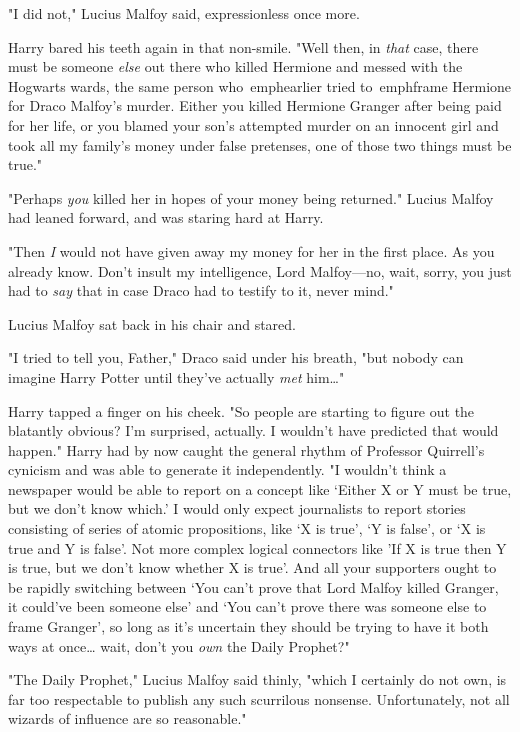 "I did not," Lucius Malfoy said, expressionless once more.

Harry bared his teeth again in that non-smile. "Well then, in \emph{that} case, 
there must be someone \emph{else} out there who killed Hermione and messed with 
the Hogwarts wards, the same person who\ emph{earlier} tried to\ emph{frame 
Hermione for Draco Malfoy's murder.} Either you killed Hermione Granger after 
being paid for her life, or you blamed your son's attempted murder on an 
innocent girl and took all my family's money under false pretenses, one of 
those two things must be true."

"Perhaps \emph{you} killed her in hopes of your money being returned." Lucius 
Malfoy had leaned forward, and was staring hard at Harry.

"Then \emph{I} would not have given away my money for her in the first place. 
As you already know. Don't insult my intelligence, Lord Malfoy---no, wait, 
sorry, you just had to \emph{say} that in case Draco had to testify to it, 
never mind."

Lucius Malfoy sat back in his chair and stared.

"I tried to tell you, Father," Draco said under his breath, "but nobody can 
imagine Harry Potter until they've actually \emph{met} him{\ldots}"

Harry tapped a finger on his cheek. "So people are starting to figure out the 
blatantly obvious? I'm surprised, actually. I wouldn't have predicted that 
would happen." Harry had by now caught the general rhythm of Professor 
Quirrell's cynicism and was able to generate it independently. "I wouldn't 
think a newspaper would be able to report on a concept like `Either X or Y must 
be true, but we don't know which.' I would only expect journalists to report 
stories consisting of series of atomic propositions, like `X is true', `Y is 
false', or `X is true and Y is false'. Not more complex logical connectors like 
'If X is true then Y is true, but we don't know whether X is true'. And all 
your supporters ought to be rapidly switching between `You can't prove that 
Lord Malfoy killed Granger, it could've been someone else' and `You can't prove 
there was someone else to frame Granger', so long as it's uncertain they should 
be trying to have it both ways at once{\ldots} wait, don't you \emph{own} the 
Daily Prophet?"

"The Daily Prophet," Lucius Malfoy said thinly, "which I certainly do not own, 
is far too respectable to publish any such scurrilous nonsense. Unfortunately, 
not all wizards of influence are so reasonable."


